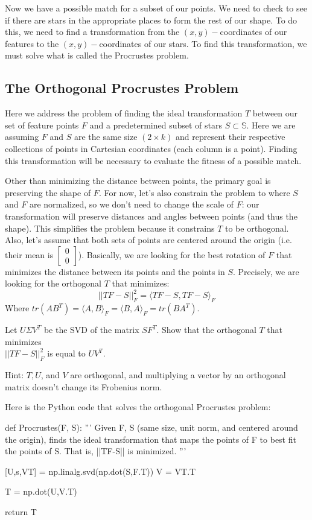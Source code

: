 \documentclass[paper=a4, fontsize=11pt]{scrartcl} %
\begin{document}
Now we have a possible match for a subset of our points. We need to check to see if there are stars in the appropriate places to form the rest of our shape. To do this, we need to find a transformation from the $(x,y)-$coordinates of our features to the $(x,y)-$coordinates of our stars. To find this transformation, we must solve what is called the Procrustes problem.

\subsection{The Orthogonal Procrustes Problem}
Here we address the problem of finding the ideal transformation $T$ between our set of feature points $F$ and a predetermined subset of stars $S\subset \mathbb{S}$. Here we are assuming $F$ and $S$ are the same size $(2\times k)$ and represent their respective collections of points in Cartesian coordinates (each column is a point).  Finding this transformation will be necessary to evaluate the fitness of a possible match.

Other than minimizing the distance between points, the primary goal is preserving the shape of $F$. For now, let's also constrain the problem to where $S$ and $F$ are normalized, so we don't need to change the scale of $F$: our transformation will preserve distances and angles between points (and thus the shape). This simplifies the problem because it constrains $T$ to be orthogonal. Also, let's assume that both sets of points are centered around the origin (i.e. their mean is $\begin{bmatrix}
0\\
0
\end{bmatrix}$). Basically, we are looking for the best rotation of $F$ that minimizes the distance between its points and the points in $S$. Precisely, we are looking for the orthogonal $T$ that minimizes: 
$$||TF-S||^2_F = \langle TF-S, TF-S\rangle_F$$
Where $tr(AB^T) = \langle A,B\rangle_F = \langle B,A\rangle_F = tr(BA^T)$.

Let $U\Sigma V^T$ be the SVD of the matrix $SF^T$. Show that the orthogonal $T$ that minimizes\\ $||TF-S||^2_F$ is equal to $UV^T$.

Hint: $T,U$, and $V$ are orthogonal, and multiplying a vector by an orthogonal matrix doesn't change its Frobenius norm.

Here is the Python code that solves the orthogonal Procrustes problem:

\begin{python}
def Procrustes(F, S):
	'''
	Given F, S (same size, unit norm, and centered around the origin), finds the
	ideal transformation that maps the points of F to best fit the points of S.
	That is, ||TF-S|| is minimized.
	'''
	
	[U,s,VT] = np.linalg.svd(np.dot(S,F.T))
	V = VT.T
	
	T = np.dot(U,V.T)
	
	return T
\end{python}
\end{document}
